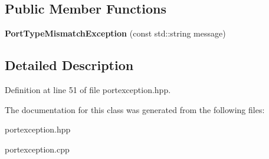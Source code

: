 \subsection*{Public Member Functions}
\begin{DoxyCompactItemize}
\item 
\hypertarget{class_port_type_mismatch_exception_aa4fa596cc94ecf73220fb1baeba44247}{}\label{class_port_type_mismatch_exception_aa4fa596cc94ecf73220fb1baeba44247} 
{\bfseries Port\+Type\+Mismatch\+Exception} (const std\+::string message)
\end{DoxyCompactItemize}


\subsection{Detailed Description}


Definition at line 51 of file portexception.\+hpp.



The documentation for this class was generated from the following files\+:\begin{DoxyCompactItemize}
\item 
portexception.\+hpp\item 
portexception.\+cpp\end{DoxyCompactItemize}
